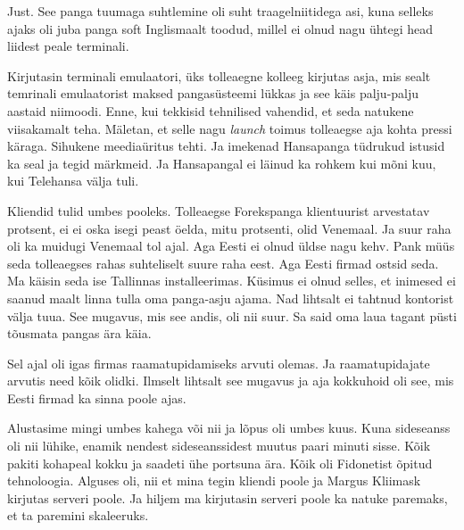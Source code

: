 Just. See panga tuumaga suhtlemine oli suht traagelniitidega asi, kuna selleks ajaks oli juba panga soft  Inglismaalt toodud, millel ei olnud nagu ühtegi head liidest peale terminali.


Kirjutasin terminali emulaatori, üks tolleaegne kolleeg kirjutas asja, mis sealt temrinali emulaatorist maksed pangasüsteemi lükkas ja see käis palju-palju aastaid niimoodi. Enne, kui  tekkisid tehnilised vahendid, et seda natukene viisakamalt teha. Mäletan, et  selle nagu \emph{launch} toimus tolleaegse  aja kohta pressi käraga. Sihukene meediaüritus tehti. Ja imekenad Hansapanga tüdrukud istusid ka seal ja tegid märkmeid. Ja Hansapangal ei läinud ka rohkem kui mõni kuu, kui Telehansa välja tuli.


Kliendid tulid umbes pooleks.  Tolleaegse Forekspanga klientuurist arvestatav protsent, ei ei oska isegi peast öelda, mitu protsenti, olid Venemaal. Ja suur raha oli ka muidugi Venemaal tol ajal. Aga Eesti ei olnud üldse nagu kehv. Pank müüs seda tolleaegses rahas suhteliselt suure raha eest. Aga Eesti firmad ostsid seda. Ma käisin seda ise Tallinnas installeerimas. Küsimus ei olnud selles, et inimesed ei saanud maalt linna tulla oma panga-asju ajama. Nad lihtsalt ei tahtnud kontorist välja tuua. See mugavus, mis see andis, oli nii suur. Sa said oma laua tagant püsti tõusmata pangas ära käia.


Sel ajal oli igas firmas raamatupidamiseks arvuti olemas. Ja raamatupidajate arvutis need kõik olidki. Ilmselt lihtsalt see mugavus ja aja kokkuhoid oli see, mis  Eesti firmad ka sinna poole ajas.


Alustasime  mingi umbes kahega või nii ja  lõpus oli  umbes kuus. Kuna sideseanss oli nii lühike, enamik nendest sideseanssidest muutus paari minuti sisse. Kõik pakiti kohapeal  kokku ja saadeti ühe portsuna ära. Kõik oli Fidonetist õpitud tehnoloogia. Alguses oli, nii et mina tegin kliendi poole ja Margus Kliimask kirjutas serveri poole. Ja hiljem ma kirjutasin serveri poole ka natuke paremaks, et ta paremini skaleeruks. 

